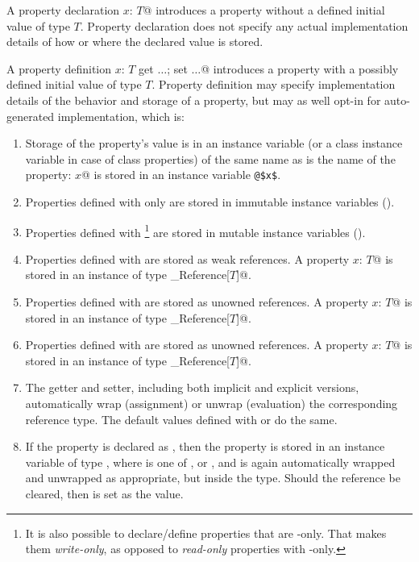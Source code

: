 A property declaration \lstinline@property $x$: $T$@ introduces a property without a defined initial value of type $T$. Property declaration does not specify any actual implementation details of how or where the declared value is stored.

A property definition \lstinline@property $x$: $T$ {get $\ldots$; set $\ldots$}@ introduces a property with a possibly defined initial value of type $T$. Property definition may specify implementation details of the behavior and storage of a property, but may as well opt-in for auto-generated implementation, which is: 

\begin{enumerate}
\item 
Storage of the property's value is in an instance variable (or a class instance variable in case of class properties) of the same name as is the name of the property: \lstinline@property $x$@ is stored in an instance variable \lstinline+@$x$+. 

\item
Properties defined with only  are stored in immutable instance variables (). 

\item
Properties defined with \footnote{It is also possible to declare/define properties that are -only. That makes them {\em write-only}, as opposed to {\em read-only} properties with -only.} are stored in mutable instance variables (). 

\item
Properties defined with  are stored as weak references. A property \lstinline@property $x$: $T$@ is stored in an instance of type \lstinline@Weak_Reference[$T$]@. 

\item
Properties defined with  are stored as unowned references. A property \lstinline@property $x$: $T$@ is stored in an instance of type \lstinline@Unowned_Reference[$T$]@. 

\item
Properties defined with  are stored as unowned references. A property \lstinline@property $x$: $T$@ is stored in an instance of type \lstinline@Soft_Reference[$T$]@. 

\item
The getter and setter, including both implicit and explicit versions, automatically wrap (assignment) or unwrap (evaluation) the corresponding reference type. The default values defined with  or  do the same. 

\item
If the property is declared as , then the property is stored in an instance variable of type , where  is one of ,  or , and is again automatically wrapped and unwrapped as appropriate, but inside the  type. Should the reference be cleared, then  is set as the value. 

\end{enumerate}


